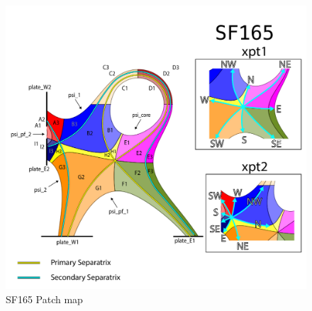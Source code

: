 \begin{figure}[H]
    \centering
        \includegraphics[width=\textwidth]{figures/configurations/SF165_collection.pdf}
        \caption{SF165 Patch map}
        \label{fig:sf165_patch_map}
\end{figure}